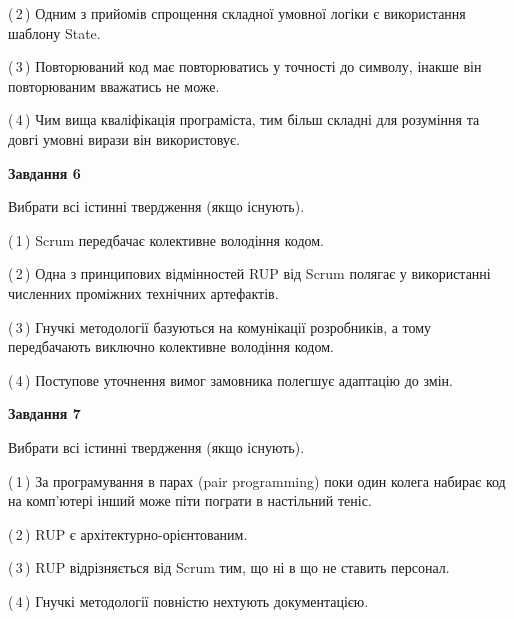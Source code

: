 \documentclass[10pt, ukrainian]{article}
\begin{document}
{\begin {large}
(\,2\,) Одним з прийомів спрощення складної умовної логіки є використання шаблону State. %



(\,3\,) Повторюваний код має повторюватись у точності до символу, інакше він повторюваним вважатись не може. %



(\,4\,) Чим вища кваліфікація програміста, тим більш складні для розуміння та довгі умовні вирази він використовує. %

\newpage

{\begin {center}\textbf{Завдання 6}\end {center}}\par
Вибрати всі істинні твердження (якщо існують).\par
\vspace{2mm}



(\,1\,) Scrum передбачає колективне володіння кодом. %



(\,2\,) Одна з принципових відмінностей RUP від Scrum полягає у використанні численних проміжних технічних артефактів. %



(\,3\,) Гнучкі методології базуються на комунікації розробників, а тому передбачають виключно колективне володіння кодом. %



(\,4\,) Поступове уточнення вимог замовника полегшує адаптацію до змін. %


{\begin {center}\textbf{Завдання 7}\end {center}}\par
Вибрати всі істинні твердження (якщо існують).\par
\vspace{2mm}



(\,1\,) За програмування в парах (pair programming) поки один колега набирає код на комп'ютері інший може піти пограти в настільний теніс. %



(\,2\,) RUP є архітектурно-орієнтованим. %



(\,3\,) RUP відрізняється від Scrum тим, що ні в що не ставить персонал.%



(\,4\,) Гнучкі методології повністю нехтують документацією. %



\end{large}}
\end{document}
